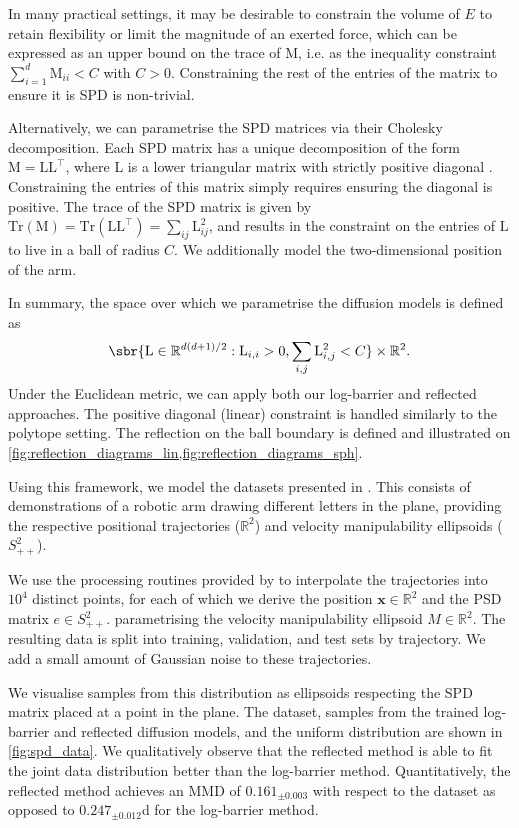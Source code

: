 In many practical settings, it may be desirable to constrain the volume of \(E\) to retain flexibility or limit the magnitude of an exerted force, which can be expressed as an upper bound on the trace of \(\mathrm{M}\), i.e. as the inequality constraint \(\sum_{i=1}^d \mathrm{M}_{ii} < C\) with \(C >0\).
Constraining the rest of the entries of the matrix to ensure it is SPD is non-trivial.

Alternatively, we can parametrise the SPD matrices via their Cholesky decomposition.
Each SPD matrix has a unique decomposition of the form \(\mathrm{M} = \mathrm{L} \mathrm{L}^\top\), where \( \mathrm{L}\) is a lower triangular matrix with strictly positive diagonal \parencite[p.143]{golub2013matrix}.
Constraining the entries of this matrix simply requires ensuring the diagonal is positive.
The trace of the SPD matrix is given by \(\mathrm{Tr}(\mathrm{M}) = \mathrm{Tr}(\mathrm{L} \mathrm{L}^\top) = \sum_{ij}\mathrm{L}_{ij}^2\), and results in the constraint on the entries of \(\mathrm{L}\) to live in a ball of radius \(C\).
We additionally model the two-dimensional position of the arm.

In summary, the space over which we parametrise the diffusion models is defined as \[\sbr{ \mathrm{L} \in \R^{d(d+1)/2} : \mathrm{L}_{i,i} > 0, \sum_{i,j} \mathrm{L}_{i,j}^2 < C } \times \R^2.\]
Under the Euclidean metric, we can apply both our log-barrier and reflected approaches.
The positive diagonal (linear) constraint is handled similarly to the polytope setting.
The reflection on the ball boundary is defined and illustrated on \cref{fig:reflection_diagrams_lin,fig:reflection_diagrams_sph}.

Using this framework, we model the datasets presented in \textcite{jaquier2021geometry}.
This consists of demonstrations of a robotic arm drawing different letters in the plane, providing the respective positional trajectories (\(\mathbb{R}^2\)) and velocity manipulability ellipsoids (\(S^2_{++}\)).

We use the processing routines provided by \textcite{jaquier2021geometry} to interpolate the trajectories into \(10^4\) distinct points, for each of which we derive the position \(\mathbf{x}\in\mathbb{R}^2\) and the PSD matrix \( e \in S^2_{++}\).
parametrising the velocity manipulability ellipsoid \(M\in\mathbb{R}^2\).
The resulting data is split into training, validation, and test sets by trajectory.
We add a small amount of Gaussian noise to these trajectories.

We visualise samples from this distribution as ellipsoids respecting the SPD matrix placed at a point in the plane.
The dataset, samples from the trained log-barrier and reflected diffusion models, and the uniform distribution are shown in \cref{fig:spd_data}.
We qualitatively observe that the reflected method is able to fit the joint data distribution better than the log-barrier method.
Quantitatively, the reflected method achieves an MMD of \(0.161_{\pm 0.003}\) with respect to the dataset as opposed to \(0.247_{\pm 0.012}\)d for the log-barrier method.

